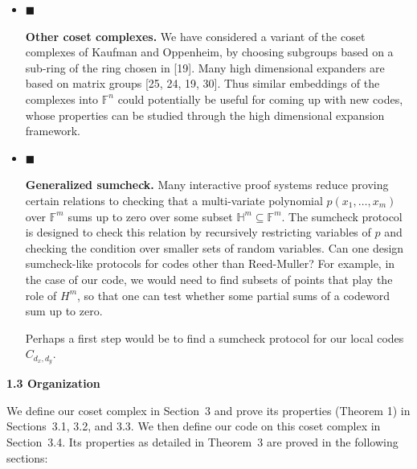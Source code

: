 \documentclass[10pt,a4paper]{article}
\begin{document}
\begin{itemize}
\item[] 
$\blacksquare$ 


\textbf{Other coset complexes.} We have considered a variant of the coset complexes of Kaufman and Oppenheim, by choosing subgroups based on a sub-ring of the ring chosen in [19]. Many high dimensional expanders are based on matrix groups [25, 24, 19, 30]. Thus similar embeddings of the complexes into $\mathbb{F}^{n}$ could potentially be useful for coming up with new codes, whose properties can be studied through the high dimensional expansion framework.\par





\item[] 
$\blacksquare$ 


\textbf{Generalized sumcheck.} Many interactive proof systems reduce proving certain relations to checking that a multi-variate polynomial $p(x_{1},\dots,x_{m})$ over $\mathbb{F}^{m}$ sums up to zero over some subset $\mathbb{H}^{m}\subseteq\mathbb{F}^{m}$. The sumcheck protocol is designed to check this relation by recursively restricting variables of $p$ and checking the condition over smaller sets of random variables.
Can one design sumcheck-like protocols for codes other than Reed-Muller? For example, in the case of our code, we would need to find subsets of points that play the role of $H^{m}$, so that one can test whether some partial sums of a codeword sum up to zero.\par




Perhaps a first step would be to find a sumcheck protocol for our local codes $C_{d_{x},d_{y}}$.\par





\end{itemize}





\par\medskip\noindent\textbf{
1.3 Organization}\par




We define our coset complex in Section 3 and prove its properties (Theorem 1) in Sections 3.1, 3.2, and 3.3. We then define our code on this coset complex in Section 3.4. Its properties as detailed in Theorem 3 are proved in the following sections:\par
\end{document}
